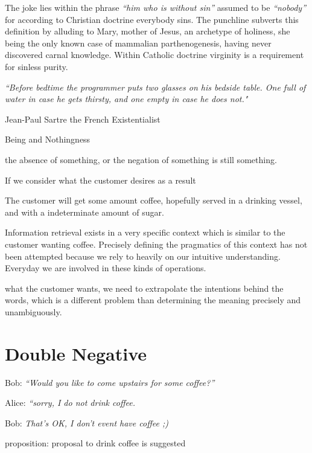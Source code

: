 The joke lies within the phrase \textit{``him who is without sin''} assumed to be \textit{``nobody''} for according to Christian doctrine everybody sins. The punchline subverts this definition by alluding to Mary, mother of Jesus, an archetype of holiness, she being the only known case of mammalian parthenogenesis, having never discovered carnal knowledge. Within Catholic doctrine virginity is a requirement for sinless purity.

\textit{``Before bedtime the programmer puts two glasses on his bedside table. One full of water in case he gets thirsty, and one empty in case he does not."}

Jean-Paul Sartre the French Existentialist

Being and Nothingness

the absence of something, or the negation of something is still something. 


If we consider what the customer desires as a result

The customer will get some amount coffee, hopefully served in a drinking vessel, and with a indeterminate amount of sugar.

Information retrieval exists in a very specific context which is similar to the customer wanting coffee. Precisely defining the pragmatics of this context has not been attempted because we rely to heavily on our intuitive understanding. Everyday we are involved in these kinds of operations.

what the customer wants, we need to extrapolate the intentions behind the words, which is a different problem than determining the meaning precisely and unambiguously.




\section{Double Negative}

Bob: \textit{``Would you like to come upstairs for some coffee?''}

Alice: \textit{``sorry, I do not drink coffee.}

Bob: \textit{That's OK, I don't event have coffee ;)}

proposition: proposal to drink coffee is suggested

